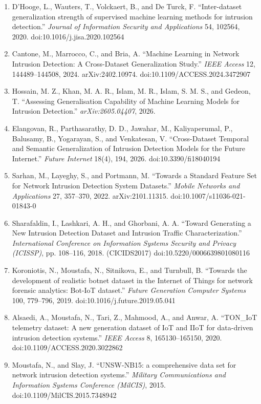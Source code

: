 \documentclass[11pt,a4paper]{article}
\begin{document}
\begin{enumerate}[leftmargin=*,itemsep=2pt]
\item D'Hooge, L., Wauters, T., Volckaert, B., and De Turck, F. ``Inter-dataset generalization strength of supervised machine learning methods for intrusion detection.'' \emph{Journal of Information Security and Applications} 54, 102564, 2020. doi:10.1016/j.jisa.2020.102564
\item Cantone, M., Marrocco, C., and Bria, A. ``Machine Learning in Network Intrusion Detection: A Cross-Dataset Generalization Study.'' \emph{IEEE Access} 12, 144489--144508, 2024. arXiv:2402.10974. doi:10.1109/ACCESS.2024.3472907
\item Hossain, M. Z., Khan, M. A. R., Islam, M. R., Islam, S. M. S., and Gedeon, T. ``Assessing Generalisation Capability of Machine Learning Models for Intrusion Detection.'' \emph{arXiv:2605.04407}, 2026.
\item Elangovan, R., Parthasarathy, D. D., Jawahar, M., Kaliyaperumal, P., Balusamy, B., Yogarayan, S., and Venkatesan, V. ``Cross-Dataset Temporal and Semantic Generalization of Intrusion Detection Models for the Future Internet.'' \emph{Future Internet} 18(4), 194, 2026. doi:10.3390/fi18040194
\item Sarhan, M., Layeghy, S., and Portmann, M. ``Towards a Standard Feature Set for Network Intrusion Detection System Datasets.'' \emph{Mobile Networks and Applications} 27, 357--370, 2022. arXiv:2101.11315. doi:10.1007/s11036-021-01843-0
\item Sharafaldin, I., Lashkari, A. H., and Ghorbani, A. A. ``Toward Generating a New Intrusion Detection Dataset and Intrusion Traffic Characterization.'' \emph{International Conference on Information Systems Security and Privacy (ICISSP)}, pp. 108--116, 2018. (CICIDS2017) doi:10.5220/0006639801080116
\item Koroniotis, N., Moustafa, N., Sitnikova, E., and Turnbull, B. ``Towards the development of realistic botnet dataset in the Internet of Things for network forensic analytics: Bot-IoT dataset.'' \emph{Future Generation Computer Systems} 100, 779--796, 2019. doi:10.1016/j.future.2019.05.041
\item Alsaedi, A., Moustafa, N., Tari, Z., Mahmood, A., and Anwar, A. ``TON\_IoT telemetry dataset: A new generation dataset of IoT and IIoT for data-driven intrusion detection systems.'' \emph{IEEE Access} 8, 165130--165150, 2020. doi:10.1109/ACCESS.2020.3022862
\item Moustafa, N., and Slay, J. ``UNSW-NB15: a comprehensive data set for network intrusion detection systems.'' \emph{Military Communications and Information Systems Conference (MilCIS)}, 2015. doi:10.1109/MilCIS.2015.7348942

\end{enumerate}
\end{document}
